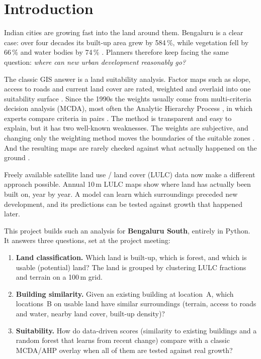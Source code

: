 \section{Introduction}\label{sec:introduction}

Indian cities are growing fast into the land around them. Bengaluru is a clear case: over four
decades its built-up area grew by 584\,\%, while vegetation fell by 66\,\% and water bodies by
74\,\% \citep{ramachandra2012}. Planners therefore keep facing the same question: \emph{where
can new urban development reasonably go?}

The classic GIS answer is a land suitability analysis. Factor maps such as slope, access to
roads and current land cover are rated, weighted and overlaid into one suitability surface
\citep{collins2001}. Since the 1990s the weights usually come from multi-criteria decision
analysis (MCDA), most often the Analytic Hierarchy Process \citep[AHP;][]{saaty1980}, in which
experts compare criteria in pairs \citep{malczewski2004}. The method is transparent and easy to
explain, but it has two well-known weaknesses. The weights are subjective, and changing only the
weighting method moves the boundaries of the suitable zones \citep{mosadeghi2015}. And the
resulting maps are rarely checked against what actually happened on the ground
\citep{malczewski2004, parry2018}.

Freely available satellite land use / land cover (LULC) data now make a different approach
possible. Annual 10\,m LULC maps \citep{karra2021} show where land has actually been built on,
year by year. A model can learn which surroundings preceded new development, and its predictions
can be tested against growth that happened later.

This project builds such an analysis for \textbf{Bengaluru South}, entirely in Python. It answers
three questions, set at the project meeting:
\begin{enumerate}
  \item \textbf{Land classification.} Which land is built-up, which is forest, and which is
        usable (potential) land? The land is grouped by clustering LULC fractions and terrain
        on a 100\,m grid.
  \item \textbf{Building similarity.} Given an existing building at location~A, which
        locations~B on usable land have similar surroundings (terrain, access to roads and
        water, nearby land cover, built-up density)?
  \item \textbf{Suitability.} How do data-driven scores (similarity to existing buildings and a
        random forest that learns from recent change) compare with a classic MCDA/AHP overlay
        when all of them are tested against real growth?
\end{enumerate}

